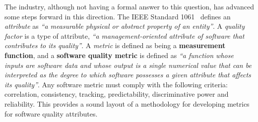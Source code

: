 The industry, although not having a formal answer to this question, has advanced some steps forward in this direction. The IEEE Standard 1061~\cite{g1:Ieee1061:1998} defines an \emph{attribute} as \emph{``a measurable physical or abstract property of an entity''}. A \emph{quality factor} is a type of attribute,
\emph{``a management-oriented attribute of software that contributes to its quality''}. A \emph{metric} is defined as being a {\bf measurement function}, and a {\bf software quality metric} is defined as \emph{``a function whose inputs are software data and whose output is a single numerical value that can be interpreted as the degree to which software possesses a given attribute that affects its quality''}. Any software metric must comply with the following criteria: correlation, consistency, tracking, predictability, discriminative power and reliability.
This provides a sound layout of a methodology for developing metrics for software quality attributes.

